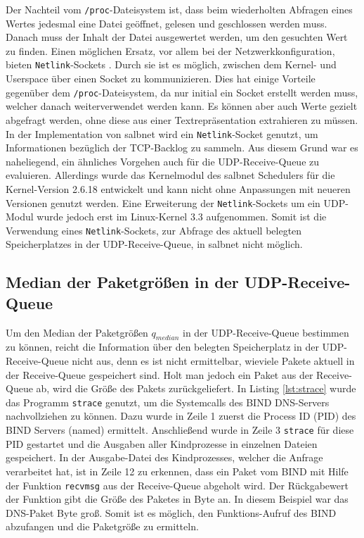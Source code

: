 \documentclass[a4paper, 12pt, BCOR10mm, DIV12, toc=bibliography, toc=listof, german]{scrbook}
\begin{document}
		Der Nachteil vom \texttt{/proc}-Dateisystem ist, dass beim wiederholten Abfragen eines Wertes
		jedesmal eine Datei geöffnet, gelesen und geschlossen werden muss. Danach muss der Inhalt der
		Datei ausgewertet werden, um den gesuchten Wert zu finden. Einen möglichen Ersatz, vor allem bei
		der Netzwerkkonfiguration, bieten \texttt{Netlink}-Sockets \cite{rfc3549, gusowski2009}.  Durch
		sie ist es möglich, zwischen dem Kernel- und Userspace über einen Socket zu kommunizieren.  Dies
		hat einige Vorteile gegenüber dem \texttt{/proc}-Dateisystem, da nur initial ein Socket erstellt
		werden muss, welcher danach weiterverwendet werden kann. Es können aber auch Werte gezielt
		abgefragt werden, ohne diese aus einer Textrepräsentation extrahieren zu müssen. In der
		Implementation von salbnet \cite{zinke2012,salbnet} wird ein \texttt{Netlink}-Socket genutzt, um
		Informationen bezüglich der TCP-Backlog zu sammeln. Aus diesem Grund war es naheliegend, ein
		ähnliches Vorgehen auch für die UDP-Receive-Queue zu evaluieren. Allerdings wurde das
		Kernelmodul des salbnet Schedulers für die Kernel-Version 2.6.18 entwickelt und kann nicht ohne
		Anpassungen mit neueren Versionen genutzt werden. Eine Erweiterung der \texttt{Netlink}-Sockets
		um ein UDP-Modul \cite{udpnetlink} wurde jedoch erst im Linux-Kernel 3.3 aufgenommen. Somit ist
		die Verwendung eines \texttt{Netlink}-Sockets, zur Abfrage des aktuell belegten Speicherplatzes
		in der UDP-Receive-Queue, in salbnet nicht möglich.

		


		\subsection*{Median der Paketgrößen in der UDP-Receive-Queue} %


		Um den Median der Paketgrößen $q_{median}$ in der UDP-Receive-Queue bestimmen zu können, reicht
		die Information über den belegten Speicherplatz in der UDP-Receive-Queue nicht aus, denn es ist
		nicht ermittelbar, wieviele Pakete aktuell in der Receive-Queue gespeichert sind. Holt man
		jedoch ein Paket aus der Receive-Queue ab, wird die Größe des Pakets zurückgeliefert. In Listing
		\ref{lst:strace} wurde das Programm \texttt{strace} genutzt, um die Systemcalls des BIND
		DNS-Servers nachvollziehen zu können. Dazu wurde in Zeile 1 zuerst die Process ID (PID) des BIND
		Servers (named) ermittelt. Anschließend wurde in Zeile 3 \texttt{strace} für diese PID gestartet
		und die Ausgaben aller Kindprozesse in einzelnen Dateien gespeichert. In der Ausgabe-Datei des
		Kindprozesses, welcher die Anfrage verarbeitet hat, ist in Zeile 12 zu erkennen, dass ein Paket
		vom BIND mit Hilfe der Funktion \texttt{recvmsg} aus der Receive-Queue abgeholt wird. Der
		Rückgabewert der Funktion gibt die Größe des Paketes in Byte an. In diesem Beispiel war das
		DNS-Paket \unit[45]{Byte} groß. Somit ist es möglich, den Funktions-Aufruf des BIND abzufangen
		und die Paketgröße zu ermitteln.
\end{document}

